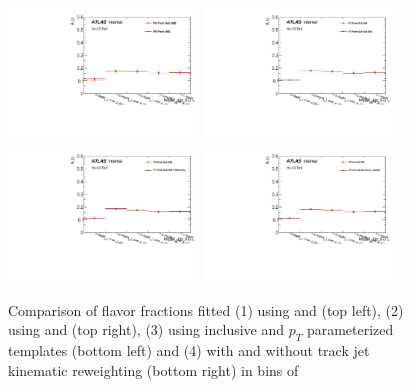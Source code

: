 \begin{figure}[htbp]
  \centering
 \includegraphics[width=0.45\textwidth]{figures/gbb/Sub_Sd0_Fits/Canv_fracmasspt_leadCrossCheck.pdf}
 \includegraphics[width=0.45\textwidth]{figures/gbb/Sub_Sd0_Fits/Canv_fracmasspt_subsubCrossCheck.pdf}\\
 \includegraphics[width=0.45\textwidth]{figures/gbb/Sub_Sd0_Fits/Canv_fracmasspt_ptbinCrossCheck.pdf}
 \includegraphics[width=0.45\textwidth]{figures/gbb/Sub_Sd0_Fits/Canv_fracmasspt_noreweightCrossCheck.pdf}\\
\caption{Comparison of flavor fractions fitted (1) using \subsdzero and \sdzero (top left), (2) using \subsdzero and \subsubsdzero (top right), (3) using inclusive and $p_T$ parameterized templates (bottom left) and (4) with and without track jet kinematic reweighting (bottom right) in bins of \mpt}
  \label{fig:fracmasspt-fitfrac-crosscheck}
\end{figure}


